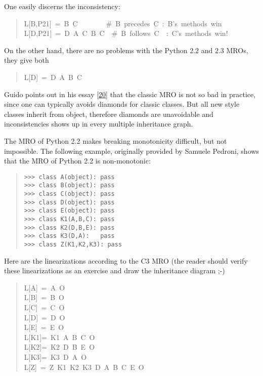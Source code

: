 \documentclass[10pt,english]{article}
\begin{document}
One easily discerns the inconsistency:
\begin{quote}
\begin{ttfamily}\begin{flushleft}
\mbox{L[B,P21]~=~B~C~~~~~~~~{\#}~B~precedes~C~:~B's~methods~win}\\
\mbox{L[D,P21]~=~D~A~C~B~C~~{\#}~B~follows~C~~:~C's~methods~win!}
\end{flushleft}\end{ttfamily}
\end{quote}

On the other hand, there are no problems with the Python 2.2 and 2.3
MROs, they give both
\begin{quote}
\begin{ttfamily}\begin{flushleft}
\mbox{L[D]~=~D~A~B~C}
\end{flushleft}\end{ttfamily}
\end{quote}

Guido points out in his essay [\hyperlink{id41}{20}] that the classic MRO is not so bad in
practice, since one can typically avoids diamonds for classic classes.
But all new style classes inherit from object, therefore diamonds are
unavoidable and inconsistencies shows up in every multiple inheritance
graph.

The MRO of Python 2.2 makes breaking monotonicity difficult, but not
impossible.  The following example, originally provided by Samuele
Pedroni, shows that the MRO of Python 2.2 is non-monotonic:
\begin{quote}
\begin{verbatim}>>> class A(object): pass
>>> class B(object): pass
>>> class C(object): pass
>>> class D(object): pass
>>> class E(object): pass
>>> class K1(A,B,C): pass
>>> class K2(D,B,E): pass
>>> class K3(D,A):   pass
>>> class Z(K1,K2,K3): pass\end{verbatim}
\end{quote}

Here are the linearizations according to the C3 MRO (the reader should
verify these linearizations as an exercise and draw the inheritance
diagram ;-)
\begin{quote}
\begin{ttfamily}\begin{flushleft}
\mbox{L[A]~=~A~O}\\
\mbox{L[B]~=~B~O}\\
\mbox{L[C]~=~C~O}\\
\mbox{L[D]~=~D~O}\\
\mbox{L[E]~=~E~O}\\
\mbox{L[K1]=~K1~A~B~C~O}\\
\mbox{L[K2]=~K2~D~B~E~O}\\
\mbox{L[K3]=~K3~D~A~O}\\
\mbox{L[Z]~=~Z~K1~K2~K3~D~A~B~C~E~O}
\end{flushleft}\end{ttfamily}
\end{quote}
\end{document}

